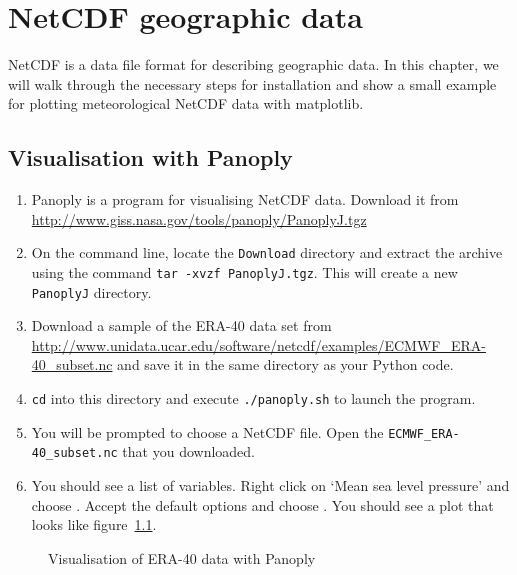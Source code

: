 \documentclass[a4paper,twoside,titlepage]{memoir}
\newcommand{\shellcmd}{\texttt}
\begin{document}
\chapter{NetCDF geographic data}
NetCDF is a data file format for describing geographic data.  In this chapter, we will walk through the necessary steps for installation and show a small example for plotting meteorological NetCDF data with matplotlib.

\section{Visualisation with Panoply}
\begin{enumerate}
\item Panoply is a program for visualising NetCDF data.  Download it from \url{http://www.giss.nasa.gov/tools/panoply/PanoplyJ.tgz}
\item On the command line, locate the \shellcmd{Download} directory and extract the archive using the command \shellcmd{tar -xvzf PanoplyJ.tgz}.  This will create a new \shellcmd{PanoplyJ} directory.
\item Download a sample of the ERA-40 data set from \url{http://www.unidata.ucar.edu/software/netcdf/examples/ECMWF_ERA-40_subset.nc} and save it in the same directory as your Python code.
\item \shellcmd{cd} into this directory and execute \shellcmd{./panoply.sh} to launch the program.
\item You will be prompted to choose a NetCDF file.  Open the \shellcmd{ECMWF\_ERA-40\_subset.nc} that you downloaded.
\item You should see a list of variables.  Right click on `Mean sea level pressure' and choose .  Accept the default options and choose .  You should see a plot that looks like figure~\ref{fig:panoply}.
\end{enumerate}

\begin{figure}
	\caption{Visualisation of ERA-40 data with Panoply}
	\label{fig:panoply}
\end{figure}
\end{document}
